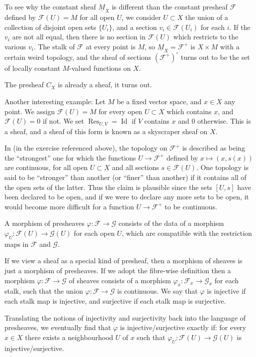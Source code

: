 \documentclass[12pt]{article}
\theoremstyle{plain}
\theoremstyle{definition}
\numberwithin{equation}{section}
\DeclareMathOperator{\res}{Res}
\DeclareMathOperator{\Id}{Id}
\newcommand{\CF}{\mathcal{F}}
\newcommand{\CG}{\mathcal{G}}
\begin{document}
To see why the constant sheaf $\underline{M}_X$ is different than the constant presheaf $\CF$ defined by $\CF(U) = M$ for all open $U$, we consider $U \subset X$ the union of a collection of disjoint open sets $\{U_i\}$, and a section $v_i \in \CF(U_i)$ for each $i$. If the $v_i$ are not all equal, then there is no section in $\CF(U)$ which restricts to the various $v_i$. The stalk of $\CF$ at every point is $M$, so $\underline{M}_X = \CF^+$ is $X \times M$ with a certain weird topology, and the sheaf of sections $(\CF^+)^\circ$ turns out to be the set of locally constant $M$-valued functions on $X$.

The presheaf $C_X$ is already a sheaf, it turns out.

Another interesting example: Let $M$ be a fixed vector space, and $x \in X$ any point. We assign $\CF(U) = M$ for every open $U \subset X$ which contains $x$, and $\CF(U) = 0$ if not. We set $\res_{U, V} = \Id$ if $V$ contains $x$ and $0$ otherwise. This is a sheaf, and a sheaf of this form is known as a skyscraper sheaf on $X$.


In \cite{Hartshorne} (in the exercise referenced above), the topology on $\CF^+$ is described as being the ``strongest'' one for which the functions $U \rightarrow \CF^+$ defined by $x \mapsto (x, s(x))$ are continuous, for all open $U \subset X$ and all sections $s \in \CF(U)$. One topology is said to be ``stronger'' than another (or ``finer'' than another) if it contains all of the open sets of the latter. Thus the claim is plausible since the sets $[U, s]$ have been declared to be open, and if we were to declare any more sets to be open, it would become more difficult for a function $U \rightarrow \CF^+$ to be continuous.


A morphism of presheaves $\varphi : \CF \rightarrow \CG$ consists of the data of a morphism $\varphi_U : \CF(U) \rightarrow \CG(U)$ for each open $U$, which are compatible with the restriction maps in $\CF$ and $\CG$.

If we view a sheaf as a special kind of presheaf, then a morphism of sheaves is just a morphism of presheaves. If we adopt the fibre-wise definition then a morphism $\varphi : \CF \rightarrow \CG$ of sheaves consists of a morphism $\varphi_x : \CF_x \rightarrow \CG_x$ for each stalk, such that the union $\varphi : \CF \rightarrow \CG$ is continuous. We say that $\varphi$ is injective if each stalk map is injective, and surjective if each stalk map is surjective.

Translating the notions of injectivity and surjectivity back into the language of presheaves, we eventually find that $\varphi$ is injective/surjective exactly if: for every $x \in X$ there exists a neighbourhood $U$ of $x$ such that $\varphi_U : \CF(U) \rightarrow \CG(U)$ is injective/surjective.
\end{document}

